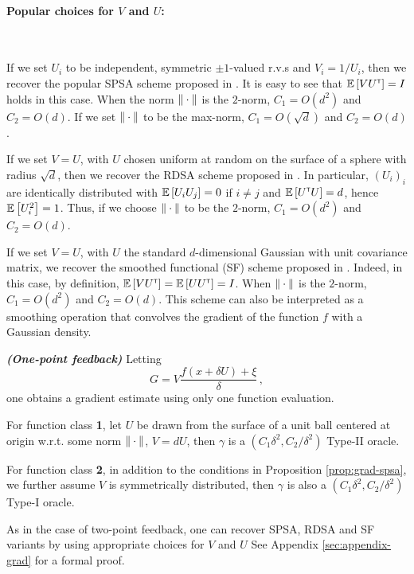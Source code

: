 \paragraph{Popular choices for $V$ and $U$:}\ \\
\begin{inparaenum}[$\bullet$]
 \item If we set $U_i$ to be independent, symmetric $\pm 1$-valued r.v.s and $V_i = 1/U_i$, then we recover the popular SPSA scheme proposed in \cite{spall1992multivariate}.
It is easy to see that $\mathbb{E}\left[  V U^\mathsf{\scriptscriptstyle T} \right] = I$ holds in this case.
 When the norm $\|\cdot\|$ is the $2$-norm, $C_1 = O(d^2)$ and $C_2 = O(d)$. If we set $\|\cdot\|$ to be the max-norm, $C_1 = O(\sqrt{d})$ and $C_2 = O(d)$.\\
 \item If we set $V=U$, with $U$ chosen uniform at random on the surface of a sphere with radius $\sqrt{d}$, 
 then we recover the RDSA scheme proposed in \cite[pp.~58-60]{kushcla}. 
 In particular, $(U_i)_i$ are identically distributed with $\mathbb{E}\left[ U_i U_j \right] = 0$ if $i\ne j$ and $\mathbb{E}\left[ U^\mathsf{\scriptscriptstyle T} U \right] = d$, hence $\mathbb{E}\left[U_i^2\right] = 1$. Thus, if we choose $\|\cdot\|$ to be the $2$-norm, $C_1 = O( d^2 )$ and $C_2 = O(d)$.
 \\
 \item If we set $V=U$, with $U$ the standard $d$-dimensional Gaussian with unit covariance matrix, we recover the smoothed functional (SF) scheme proposed in \cite{katkul}. 
Indeed, in this case, by definition, $\mathbb{E}\left[VU^\mathsf{\scriptscriptstyle T}\right] = \mathbb{E}\left[U U^\mathsf{\scriptscriptstyle T} \right] = I$.
When $\|\cdot\|$ is the $2$-norm, $C_1 = O(d^2)$
 and $C_2 = O( d)$.
 This scheme can also be interpreted as a smoothing operation that  convolves the gradient of the function $f$ with a Gaussian density.
\end{inparaenum}

\begin{proposition}\textbf{\textit{(One-point feedback)}}
 Letting 
 \[
 G =  V \dfrac{f(x+\delta U) + \xi}{\delta}\,,
 \]
 one obtains a gradient estimate using only one function evaluation.
 
For function class \textbf{1},  let $U$ be drawn from the surface of a unit ball centered at origin w.r.t. some norm $\|\cdot\|$, $V=dU$, then $\gamma$ is a $(C_1\delta^2, C_2/\delta^2)$ Type-II oracle.
 
 For function class \textbf{2}, in addition to the conditions in Proposition \ref{prop:grad-spsa}, we further assume $V$ is symmetrically distributed, then $\gamma$ is also a $(C_1\delta^2, C_2/\delta^2)$ Type-I oracle.
 
\end{proposition}
As in the case of two-point feedback, one can recover SPSA, RDSA and SF variants by using appropriate choices for $V$ and $U$ See Appendix \ref{sec:appendix-grad} for a formal proof.

